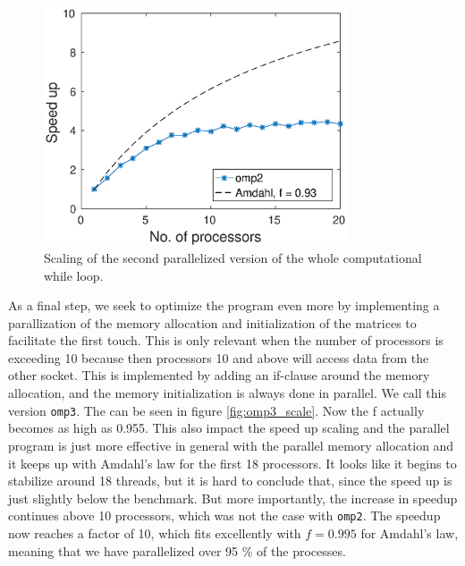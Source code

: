 \begin{figure}[h!]
\centering
\includegraphics[width = 0.8\textwidth]{fig/speedup_omp2.eps}
\caption{Scaling of the second parallelized version of the whole computational while loop.}
\label{fig:omp2_scale}
\end{figure}

As a final step, we seek to optimize the program even more by implementing a parallization of the memory allocation and initialization of the matrices to facilitate the first touch. This is only relevant when the number of processors is exceeding 10 because then processors 10 and above will access data from the other socket. This is implemented by adding an if-clause around the memory allocation, and the memory initialization is always done in parallel. We call this version \texttt{omp3}. The can be seen in figure \ref{fig:omp3_scale}. Now the f actually becomes as high as 0.955. This also impact the speed up scaling and the parallel program is just more effective in general with the parallel memory allocation and it keeps up with Amdahl's law for the first 18 processors. It looks like it begins to stabilize around 18 threads, but it is hard to conclude that, since the speed up is just slightly below the benchmark. But more importantly, the increase in speedup continues above 10 processors, which was not the case with \texttt{omp2}. The speedup now reaches a factor of 10, which fits excellently with $f = 0.995$ for Amdahl's law, meaning that we have parallelized over 95 \% of the processes.

